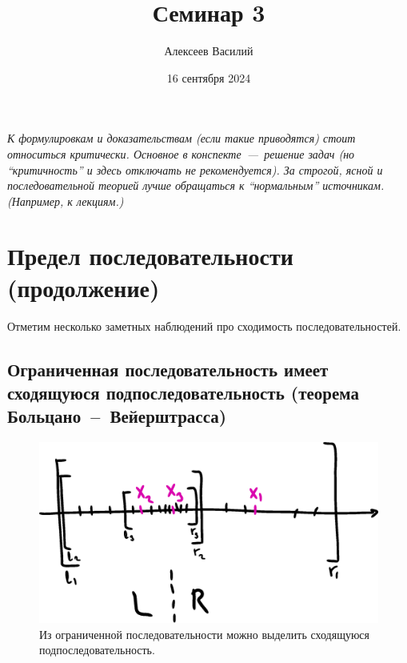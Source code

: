 \documentclass[a4paper,12pt]{article}
\author{Алексеев Василий}
\title{Семинар 3}
\date{16 сентября 2024}
\begin{document}
  \maketitle
  
  \tableofcontents

  \thispagestyle{empty}
  
  \newpage
  
  
  
  \vspace*{\fill}
  
  \noindent
  \emph{
    К формулировкам и доказательствам (если такие приводятся) стоит относиться критически.
    Основное в конспекте~---~решение задач (но ``критичность'' и здесь отключать не рекомендуется).
    За строгой, ясной и последовательной теорией лучше обращаться к ``нормальным'' источникам.
    (Например, к лекциям.)
  }
  
  \vspace*{\fill}
  
  \thispagestyle{empty}
  
  \newpage
  
  


  \section{Предел последовательности (продолжение)}
  
  Отметим несколько заметных наблюдений про сходимость последовательностей.
  
  
  \subsection{Ограниченная последовательность имеет сходящуюся подпоследовательность (теорема Больцано~--~Вейерштрасса)}
  
  \begin{figure}[ht]
    \centering
    \includegraphics[width=0.6\linewidth]{images/bolcano-v}
    
    \caption{
      Из ограниченной последовательности можно выделить сходящуюся подпоследовательность.
    }
    \label{fig:bolcano-v}
  \end{figure}
  
\end{document}
